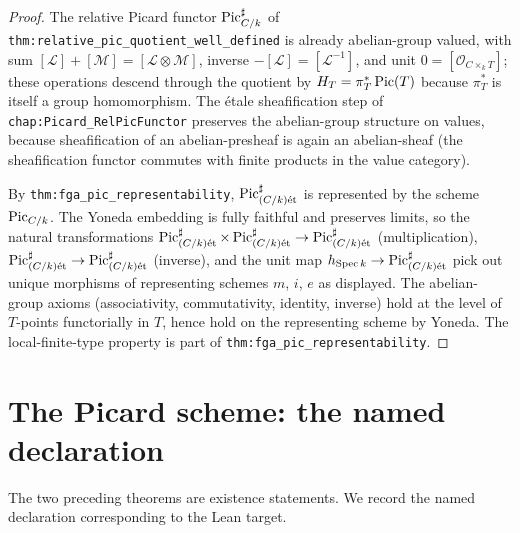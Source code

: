 \begin{proof}
  
  The relative Picard functor \(\operatorname{Pic}^\sharp_{C/k}\) of
  \texttt{thm:relative_pic_quotient_well_defined} is already abelian-group
  valued, with sum \([\mathcal{L}] + [\mathcal{M}] = [\mathcal{L} \otimes
  \mathcal{M}]\), inverse \(-[\mathcal{L}] = [\mathcal{L}^{-1}]\), and unit
  \(0 = [\mathcal{O}_{C \times_k T}]\); these operations descend through
  the quotient by \(H_T = \pi_T^*\operatorname{Pic}(T)\) because \(\pi_T^*\) is itself a
  group homomorphism. The \'etale sheafification step of
  \texttt{chap:Picard_RelPicFunctor} preserves the abelian-group structure
  on values, because sheafification of an abelian-presheaf is again an
  abelian-sheaf (the sheafification functor commutes with finite products
  in the value category).

  By \texttt{thm:fga_pic_representability}, \(\operatorname{Pic}^\sharp_{(C/k)\mathrm{\acute{e}t}}\) is
  represented by the scheme \(\operatorname{Pic}_{C/k}\). The Yoneda embedding is fully
  faithful and preserves limits, so the natural transformations
  $\operatorname{Pic}^\sharp_{(C/k)\mathrm{\acute{e}t}} \times \operatorname{Pic}^\sharp_{(C/k)\mathrm{\acute{e}t}} \to
  \operatorname{Pic}^\sharp_{(C/k)\mathrm{\acute{e}t}}$ (multiplication),
  \(\operatorname{Pic}^\sharp_{(C/k)\mathrm{\acute{e}t}} \to \operatorname{Pic}^\sharp_{(C/k)\mathrm{\acute{e}t}}\) (inverse), and the
  unit map \(h_{\operatorname{Spec} k} \to \operatorname{Pic}^\sharp_{(C/k)\mathrm{\acute{e}t}}\) pick out unique
  morphisms of representing schemes \(m\), \(i\), \(e\) as displayed. The
  abelian-group axioms (associativity, commutativity, identity,
  inverse) hold at the level of \(T\)-points functorially in \(T\), hence
  hold on the representing scheme by Yoneda. The local-finite-type
  property is part of \texttt{thm:fga_pic_representability}.
\end{proof}

\section{The Picard scheme: the named declaration}
\label{sec:fga_pic_named_definition}

The two preceding theorems are existence statements. We record the
named declaration corresponding to the Lean target.

